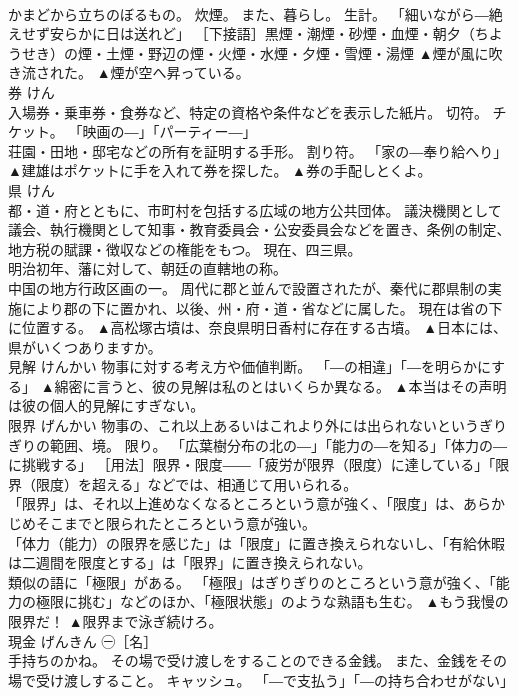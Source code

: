 \documentclass[8pt]{extreport}
\begin{document}
\begin{CJK}{UTF8}{min}
\\	かまどから立ちのぼるもの。 炊煙。 また、暮らし。 生計。 「細いながら―絶えせず安らかに日は送れど」 ［下接語］黒煙・潮煙・砂煙・血煙・朝夕（ちようせき）の煙・土煙・野辺の煙・火煙・水煙・夕煙・雪煙・湯煙	▲煙が風に吹き流された。 ▲煙が空へ昇っている。
\\	券	けん	
\\	入場券・乗車券・食券など、特定の資格や条件などを表示した紙片。 切符。 チケット。 「映画の―」「パーティー―」 
\\	荘園・田地・邸宅などの所有を証明する手形。 割り符。 「家の―奉り給へり」	▲建雄はポケットに手を入れて券を探した。 ▲券の手配しとくよ。
\\	県	けん	
\\	都・道・府とともに、市町村を包括する広域の地方公共団体。 議決機関として議会、執行機関として知事・教育委員会・公安委員会などを置き、条例の制定、地方税の賦課・徴収などの権能をもつ。 現在、四三県。 
\\	明治初年、藩に対して、朝廷の直轄地の称。 
\\	中国の地方行政区画の一。 周代に郡と並んで設置されたが、秦代に郡県制の実施により郡の下に置かれ、以後、州・府・道・省などに属した。 現在は省の下に位置する。	▲高松塚古墳は、奈良県明日香村に存在する古墳。 ▲日本には、県がいくつありますか。
\\	見解	けんかい	物事に対する考え方や価値判断。 「―の相違」「―を明らかにする」	▲綿密に言うと、彼の見解は私のとはいくらか異なる。 ▲本当はその声明は彼の個人的見解にすぎない。
\\	限界	げんかい	物事の、これ以上あるいはこれより外には出られないというぎりぎりの範囲、境。 限り。 「広葉樹分布の北の―」「能力の―を知る」「体力の―に挑戦する」 ［用法］限界・限度――「疲労が限界（限度）に達している」「限界（限度）を超える」などでは、相通じて用いられる。 
\\	「限界」は、それ以上進めなくなるところという意が強く、「限度」は、あらかじめそこまでと限られたところという意が強い。 
\\	「体力（能力）の限界を感じた」は「限度」に置き換えられないし、「有給休暇は二週間を限度とする」は「限界」に置き換えられない。 
\\	類似の語に「極限」がある。 「極限」はぎりぎりのところという意が強く、「能力の極限に挑む」などのほか、「極限状態」のような熟語も生む。	▲もう我慢の限界だ！ ▲限界まで泳ぎ続けろ。
\\	現金	げんきん	㊀［名］ 
\\	手持ちのかね。 その場で受け渡しをすることのできる金銭。 また、金銭をその場で受け渡しすること。 キャッシュ。 「―で支払う」「―の持ち合わせがない」 

\end{CJK}
\end{document}
